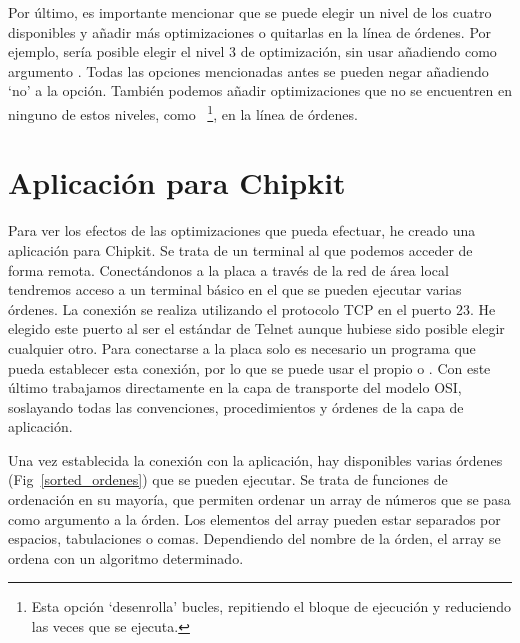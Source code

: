 Por último, es importante mencionar que se puede elegir un nivel de los cuatro disponibles y añadir más optimizaciones o quitarlas en la línea de órdenes. Por ejemplo, sería posible elegir el nivel 3 de optimización, sin usar  añadiendo como argumento . Todas las opciones mencionadas antes se pueden negar añadiendo `no' a la opción. También podemos añadir optimizaciones que no se encuentren en ninguno de estos niveles, como ~\footnote{Esta opción `desenrolla' bucles, repitiendo el bloque de ejecución y reduciendo las veces que se ejecuta.}, en la línea de órdenes.

\section{Aplicación para Chipkit}

Para ver los efectos de las optimizaciones que  pueda efectuar, he creado una aplicación para Chipkit. Se trata de un terminal al que podemos acceder de forma remota. Conectándonos a la placa a través de la red de área local tendremos acceso a un terminal básico en el que se pueden ejecutar varias órdenes. La conexión se realiza utilizando el protocolo TCP en el puerto 23. He elegido este puerto al ser el estándar de Telnet aunque hubiese sido posible elegir cualquier otro. Para conectarse a la placa solo es necesario un programa que pueda establecer esta conexión, por lo que se puede usar el propio  o . Con este último trabajamos directamente en la capa de transporte del modelo OSI, soslayando todas las convenciones, procedimientos y órdenes de la capa de aplicación.

Una vez establecida la conexión con la aplicación, hay disponibles varias órdenes (Fig~\ref{sorted_ordenes}) que se pueden ejecutar. Se trata de funciones de ordenación en su mayoría, que permiten ordenar un array de números que se pasa como argumento a la órden. Los elementos del array pueden estar separados por espacios, tabulaciones o comas. Dependiendo del nombre de la órden, el array se ordena con un algoritmo determinado.

